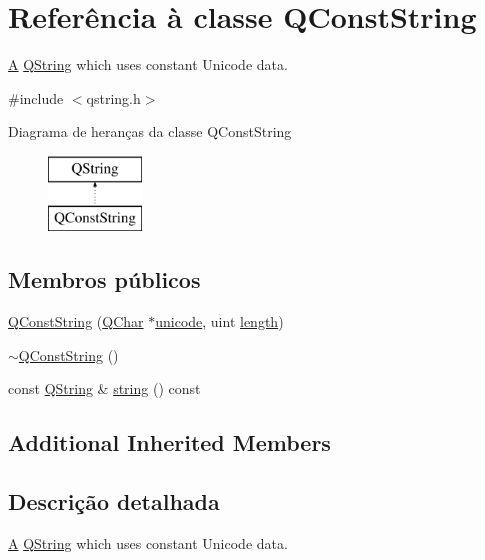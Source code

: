 \hypertarget{class_q_const_string}{\section{Referência à classe Q\-Const\-String}
\label{class_q_const_string}
}


\hyperlink{class_a}{A} \hyperlink{class_q_string}{Q\-String} which uses constant Unicode data.  




{\ttfamily \#include $<$qstring.\-h$>$}

Diagrama de heranças da classe Q\-Const\-String\begin{figure}[H]
\begin{center}
\leavevmode
\includegraphics[height=2.000000cm]{class_q_const_string}
\end{center}
\end{figure}
\subsection*{Membros públicos}
\begin{DoxyCompactItemize}
\item 
\hyperlink{class_q_const_string_a27709b578dc2cebaef8d4dfcc34015b4}{Q\-Const\-String} (\hyperlink{class_q_char}{Q\-Char} $\ast$\hyperlink{class_q_string_a65a250696de2e5cb83a8e01a9603cea0}{unicode}, uint \hyperlink{class_q_string_ab0edbf251efc0562d70132e931e3cf06}{length})
\item 
\hyperlink{class_q_const_string_a1b56de3213a21be7dceef30256851c18}{$\sim$\-Q\-Const\-String} ()
\item 
const \hyperlink{class_q_string}{Q\-String} \& \hyperlink{class_q_const_string_a349f809b1e7470f041f9e521eba45d95}{string} () const 
\end{DoxyCompactItemize}
\subsection*{Additional Inherited Members}


\subsection{Descrição detalhada}
\hyperlink{class_a}{A} \hyperlink{class_q_string}{Q\-String} which uses constant Unicode data. 


